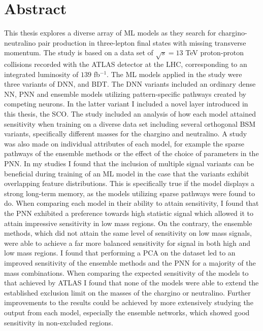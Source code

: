 \chapter*{Abstract} 
This thesis explores a diverse array of \acf{ML} models as they search for chargino-neutralino pair production in 
three-lepton final states with missing transverse momentum. The study is based on a data set of $\sqrt{s} = 13$ TeV proton-proton
collisions recorded with the \acs{ATLAS} detector at the \acs{LHC}, corresponding to an integrated luminosity of $139$ fb$^{-1}$. The \acs{ML} 
models applied in the study were three variants of \acf{DNN}, and \acf{BDT}. The \acs{DNN} variants included an ordinary 
dense \acf{NN}, \acf{PNN} and ensemble models utilizing pattern-specific pathways created by competing neurons. In the latter variant I 
included a novel layer introduced in this thesis, the \acf{SCO}. The study included an analysis of how each model attained sensitivity 
when training on a diverse data set including several orthogonal \acf{BSM} variants, specifically different masses for the chargino and neutralino. 
A study was also made on individual attributes of each model, for example the sparse pathways of the ensemble methods or the effect 
of the choice of parameters in the \acs{PNN}. In my studies I found that the inclusion of multiple signal variants can be beneficial during 
training of an \ac{ML} model in the case that the variants exhibit overlapping feature distributions. This is specifically true if 
the model displays a strong long-term memory, as the models utilizing sparse pathways were found to do. When comparing each 
model in their ability to attain sensitivity, I found that the \acs{PNN} exhibited a preference towards high statistic signal which allowed it 
to attain impressive sensitivity in low mass regions. On the contrary, the ensemble methods, which did not attain the same level of sensitivity 
on low mass signals, were able to achieve a far more balanced sensitivity for signal in both high and low mass regions. I found that performing a 
\acf{PCA} on the dataset led to an improved sensitivity of the ensemble methods and the \ac{PNN} for a majority of the mass combinations.
When comparing the expected sensitivity of the models to that achieved by \acs{ATLAS} I found that none of the models were able to extend the established 
exclusion limit on the masses of the chargino or neutralino. Further improvements to the results could be achieved by more extensively studying the 
output from each model, especially the ensemble networks, which showed good sensitivity in non-excluded regions.